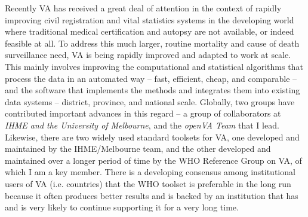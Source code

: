 \documentclass[12pt]{article}
\begin{document}
Recently VA has received a great deal of attention in the context of rapidly improving civil registration and vital statistics systems in the developing world where traditional medical certification and autopsy are not available, or indeed feasible at all.  To address this much larger, routine mortality and cause of death surveillance need, VA is being rapidly improved and adapted to work at scale.  This mainly involves improving the computational and statistical algorithms that process the data in an automated way -- fast, efficient, cheap, and comparable -- and the software that implements the methods and integrates them into existing data systems -- district, province, and national scale. Globally, two groups have contributed important advances in this regard -- a group of collaborators at \textit{IHME and the University of Melbourne}, and the \textit{openVA Team} that I lead.  Likewise, there are two widely used standard toolsets for VA, one developed and maintained by the IHME/Melbourne team, and the other developed and maintained over a longer period of time by the WHO Reference Group on VA, of which I am a key member.  There is a developing consensus among institutional users of VA (i.e. countries) that the WHO toolset is preferable in the long run because it often produces better results and is backed by an institution that has and is very likely to continue supporting it for a very long time.
\end{document}
